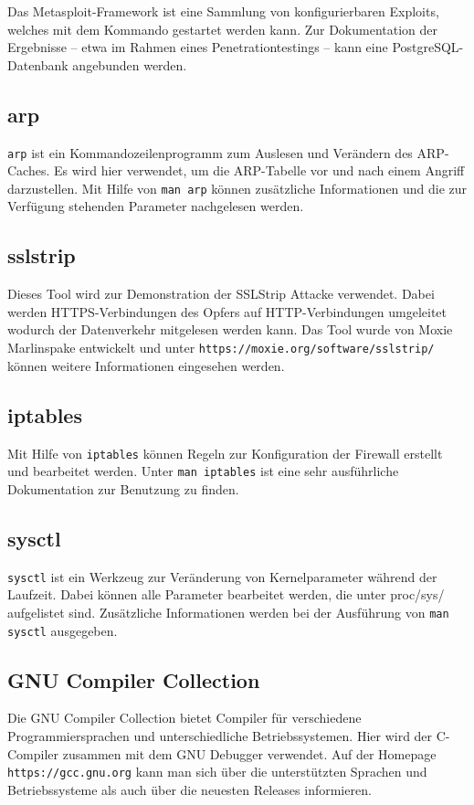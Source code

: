 Das Metasploit-Framework ist eine Sammlung von konfigurierbaren Exploits, welches mit dem Kommando  gestartet werden kann. Zur Dokumentation der Ergebnisse -- etwa im Rahmen eines Penetrationtestings -- kann eine PostgreSQL-Datenbank angebunden werden.

\subsection{arp}
\colorbox{altgray}{\lstinline|arp|} ist ein Kommandozeilenprogramm zum Auslesen und Verändern des ARP-Caches. Es wird hier verwendet, um die ARP-Tabelle vor und nach einem Angriff darzustellen. Mit Hilfe von \colorbox{altgray}{\lstinline|man arp|} können zusätzliche Informationen und die zur Verfügung stehenden Parameter nachgelesen werden.

\subsection{sslstrip}
Dieses Tool wird zur Demonstration der SSLStrip Attacke verwendet. Dabei werden HTTPS-Verbindungen des Opfers auf HTTP-Verbindungen umgeleitet wodurch der Datenverkehr mitgelesen werden kann. Das Tool wurde von Moxie Marlinspake entwickelt und unter \colorbox{altgray}{\lstinline|https://moxie.org/software/sslstrip/ |} können weitere Informationen eingesehen werden.

\subsection{iptables}
Mit Hilfe von \colorbox{altgray}{\lstinline|iptables|} können Regeln zur Konfiguration der Firewall erstellt und bearbeitet werden. Unter \colorbox{altgray}{\lstinline|man iptables|} ist eine sehr ausführliche Dokumentation zur Benutzung zu finden.

\subsection{sysctl}
\colorbox{altgray}{\lstinline|sysctl|} ist ein Werkzeug zur Veränderung von Kernelparameter während der Laufzeit. Dabei können alle Parameter bearbeitet werden, die unter proc/sys/ aufgelistet sind. Zusätzliche Informationen werden bei der Ausführung von \colorbox{altgray}{\lstinline|man sysctl|} ausgegeben.

\subsection{GNU Compiler Collection}
Die GNU Compiler Collection bietet Compiler für verschiedene Programmiersprachen und unterschiedliche Betriebssystemen. Hier wird der C-Compiler zusammen mit dem GNU Debugger verwendet. Auf der Homepage \colorbox{altgray}{\lstinline|https://gcc.gnu.org|} kann man sich über die unterstützten Sprachen und Betriebssysteme als auch über die neuesten Releases informieren.

